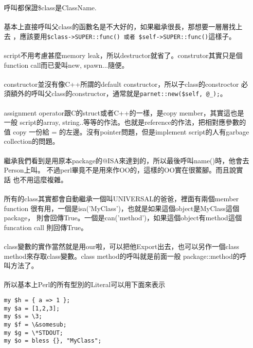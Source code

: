     呼叫都保證\$class是ClassName.
    \\\\
    基本上直接呼叫父class的函數名是不大好的，如果繼承很長，那想要一層層找上去
    ，應該要用\verb=$class->SUPER::func() 或者 $self->SUPER::func()=這樣子。
    \\\\
    script不用考慮甚麼memory leak，所以destructor就省了。construtor其實只是個
    function call而已愛叫new, spawn...隨便。
    \\\\
    constructor並沒有像C++所謂的default constructor，所以子class的constroctor
    必須額外的呼叫父class的constructor，通常就是\verb=parnet::new($self, @_);=。
    \\\\
    assignment operator跟C的struct或者C++的一樣，是copy member，其實這也是一般
    script的array, string..等等的作法。也就是reference的作法，把相對應參數的值
    copy 一份給 = 的左邊。沒有pointer問題，但是implement script的人有garbage 
    collection的問題。
    \\\\
    繼承我們看到是用原本package的@ISA來達到的，所以最後呼叫name()時，他會去
    Person上叫。 不過perl畢竟不是用來作OO的，這樣的OO實在很鱉腳。而且說實話
    也不用這麼複雜。
    \\\\
    所有的class其實都會自動繼承一個叫UNIVERSAL的爸爸，裡面有兩個member function
    很有用，一個是isa('MyClass')，也就是如果這個object是MyClass這個package，
    則會回傳True。一個是can('method')，如果這個object有method這個funcation call
    則回傳True。
    \\\\
    class變數的實作當然就是用our啦，可以把他Export出去，也可以另作一個class 
    method來存取class變數。class method的呼叫就是前面一般
    package::method的呼叫方法了。
    \\\\
    所以基本上Perl的所有型別的Literal可以用下面來表示
    \begin{verbatim}
my $h = { a => 1 };
my $a = [1,2,3];
my $s = \3;
my $f = \&somesub;
my $g = \*STDOUT;
my $o = bless {}, "MyClass";
    \end{verbatim}

